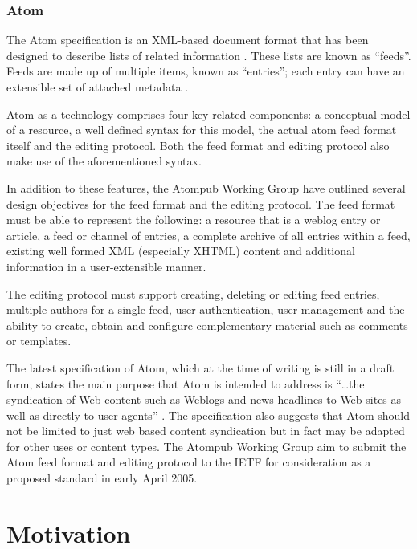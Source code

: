 \documentclass{CRPITStyle}
\begin{document}
\subsubsection{Atom}

The Atom  specification is an XML-based document format that has been
designed to describe lists of related information
\cite{Nott-M-2005-Atom}. These lists are known as ``feeds''. Feeds are
made up of multiple items, known as ``entries''; each entry can have an
extensible set of attached metadata \cite{Nott-M-2005-Atom}.

Atom as a technology comprises four key related components: a conceptual
model of a resource, a well defined syntax for this model, the actual
atom feed format itself and the editing protocol. Both the feed format
and editing protocol also make use of the aforementioned syntax.

In addition to these features, the Atompub Working Group have outlined
several design objectives for the feed format and the editing protocol.
The feed format must be able to represent the following: a resource that
is a weblog entry or article, a feed or channel of entries, a complete
archive of all entries within a feed, existing well formed XML
(especially XHTML) content and additional information in a
user-extensible manner.

The editing protocol must support creating, deleting or editing feed
entries, multiple authors for a single feed, user authentication, user
management and the ability to create, obtain and configure complementary
material such as comments or templates.

The latest specification of Atom, which at the time of writing is still
in a draft form, states the main purpose that Atom is intended to
address is ``\ldots{}the syndication of Web content such as Weblogs and
news headlines to Web sites as well as directly to user agents''
\cite{Nott-M-2005-Atom}. The specification also suggests that Atom
should not be limited to just web based content syndication but in fact
may be adapted for other uses or content types. The Atompub Working
Group aim to submit the Atom feed format and editing protocol to the
IETF for consideration as a proposed standard in early April 2005.

\section{Motivation}
\end{document}
